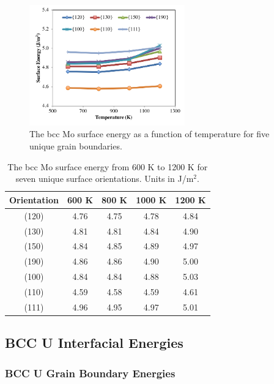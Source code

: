 \documentclass[review]{elsarticle}
\begin{document}
\begin{figure}[h]
 \centering
 \includegraphics[width=0.6\textwidth]{mosurf.png}
 \caption{The bcc Mo surface energy as a function of temperature for five unique grain boundaries.}
 \label{fig:mosurf}
\end{figure}

\begin{table}[h]
\caption{The bcc Mo surface energy from 600 K to 1200 K for seven unique surface orientations. Units in J/m$^{2}$. } \label{tab:mosurf}
\begin{center}
\begin{tabular}{|c|c|c|c|c|}
	\hline
	Orientation & 600 K & 800 K & 1000 K & 1200 K \\
	 \hline
	 (120) & 4.76 & 4.75 & 4.78 & 4.84 \\
	 (130) & 4.81 & 4.81 & 4.84 & 4.90 \\
	 (150) & 4.84 & 4.85 & 4.89 & 4.97 \\
	 (190) & 4.86 & 4.86 & 4.90 & 5.00 \\
	 (100) & 4.84 & 4.84 & 4.88 & 5.03 \\
	 (110) & 4.59 & 4.58 & 4.59 & 4.61 \\
	 (111) & 4.96 & 4.95 & 4.97 & 5.01 \\	 
	 \hline
\end{tabular}
\end{center}
\label{default}
\end{table}

\FloatBarrier



\subsection{BCC U Interfacial Energies}
\subsubsection{BCC U Grain Boundary Energies}
\end{document}
